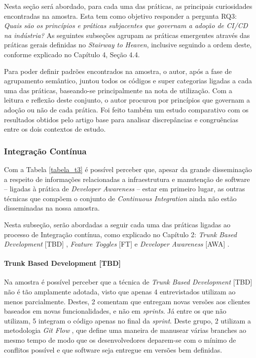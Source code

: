 Nesta seção será abordado, para cada uma das práticas, as principais curiosidades encontradas na amostra. Esta tem como objetivo responder a pergunta RQ3: \emph{Quais são os princípios e práticas subjacentes que governam a adoção de CI/CD na indústria?} As seguintes subseções agrupam as práticas emergentes através das práticas gerais definidas no \emph{Stairway to Heaven}, inclusive seguindo a ordem deste, conforme explicado no Capítulo 4, Seção 4.4.

Para poder definir padrões encontrados na amostra, o autor, após a fase de agrupamento semântico, juntou todos os códigos e super categorias ligadas a cada uma das práticas, baseando-se principalmente na nota de utilização. Com a leitura e reflexão deste conjunto, o autor procurou por princípios que governam a adoção ou não de cada prática. Foi feito também um estudo comparativo com os resultados obtidos pelo artigo base para analisar discrepâncias e congruências entre os dois contextos de estudo.

\subsubsection{Integração Contínua}

Com a Tabela \ref{tabela_t3} é possível perceber que, apesar da grande disseminação a respeito de informações relacionadas a infraestrutura e manutenção de software -- ligadas à prática de \emph{Developer Awareness} \cite{awa} -- estar em primeiro lugar, as outras técnicas que compõem o conjunto de \emph{Continuous Integration} ainda não estão disseminadas na nossa amostra.

Nesta subseção, serão abordadas a seguir cada uma das práticas ligadas ao processo de Integração contínua, como explicado no Capítulo 2: \emph{Trunk Based Development} [TBD] \cite{devAndDeploymentFB}, \emph{Feature Toggles} [FT] \cite{featureToggles} e \emph{Developer Awareness} [AWA] .


\paragraph{Trunk Based Development [TBD]}
Na amostra é possível perceber que a técnica de \emph{Trunk Based Development} [TBD] não é tão amplamente adotada, visto que apenas 4 entrevistados utilizam ao menos parcialmente. Destes, 2 comentam que entregam novas versões aos clientes baseados em novas funcionalidades, e não em \emph{sprints}. Já entre os que não utilizam, 5 integram o código apenas no final da \emph{sprint}. Deste grupo, 2 utilizam a metodologia \emph{Git Flow} \cite{gitFlow}, que define uma maneira de manusear várias branches ao mesmo tempo de modo que os desenvolvedores deparem-se com o mínimo de conflitos possível e que software seja entregue em versões bem definidas.

